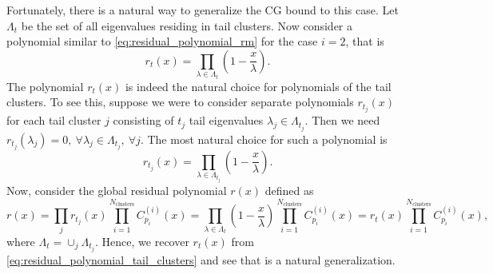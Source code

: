 Fortunately, there is a natural way to generalize the CG bound to this case. Let $\Lambda_{t}$ be the set of all eigenvalues residing in tail clusters. Now consider a polynomial similar to \cref{eq:residual_polynomial_rm} for the case $i=2$, that is
\begin{equation}
    r_{t}(x) = \prod_{\lambda\in\Lambda_{t}} \left(1 - \frac{x}{\lambda}\right).
    \label{eq:residual_polynomial_tail_clusters}
\end{equation}
The polynomial $r_t(x)$ is indeed the natural choice for polynomials of the tail clusters. To see this, suppose we were to consider separate polynomials $r_{t_j}(x)$ for each tail cluster $j$ consisting of $t_j$ tail eigenvalues $\lambda_j\in\Lambda_{t_j}$. Then we need $r_{t_j}(\lambda_j) = 0, \ \forall \lambda_j \in \Lambda_{t_j}, \ \forall j$. The most natural choice for such a polynomial is
\begin{equation}
    r_{t_j}(x) = \prod_{\lambda\in\Lambda_{t_j}} \left(1 - \frac{x}{\lambda}\right).
\end{equation}
Now, consider the global residual polynomial $r(x)$ defined as
\begin{equation}
    r(x) = \prod_{j} r_{t_j}(x) \prod_{i=1}^{N_{\text{clusters}}} C^{(i)}_{p_i}(x)= \prod_{\lambda\in\Lambda_{t}} \left(1 - \frac{x}{\lambda}\right)\prod_{i=1}^{N_{\text{clusters}}} C^{(i)}_{p_i}(x) = r_t(x)\prod_{i=1}^{N_{\text{clusters}}} C^{(i)}_{p_i}(x), 
    \label{eq:residual_polynomial_tail_clusters_global}
\end{equation}
where $\Lambda_{t} = \cup_{j} \Lambda_{t_j}$. Hence, we recover $r_t(x)$ from \cref{eq:residual_polynomial_tail_clusters} and see that is a natural generalization.

